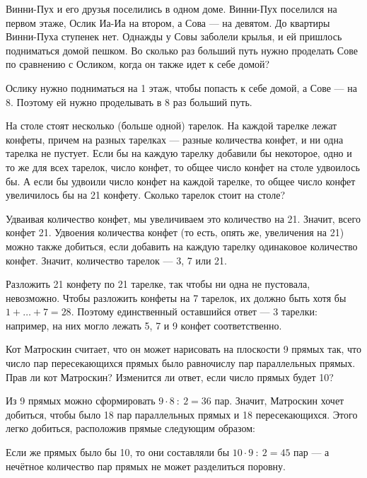

\begin{itemize}

	\itA Винни-Пух и его друзья поселились в одном доме. Винни-Пух поселился на первом этаже, Ослик Иа-Иа на втором, а Сова — на девятом. До квартиры Винни-Пуха ступенек нет. Однажды у Совы заболели крылья, и ей пришлось подниматься домой пешком. Во сколько раз больший путь нужно проделать Сове по сравнению с Осликом, когда он также идет к себе домой?
	
	\itr Ослику нужно подниматься на 1 этаж, чтобы попасть к себе домой, а Сове — на 8. Поэтому ей нужно проделывать в 8 раз больший путь.

	\itB На столе стоят несколько (больше одной) тарелок. На каждой тарелке лежат конфеты, причем на разных тарелках — разные количества конфет, и ни одна тарелка не пустует. Если бы на каждую тарелку добавили бы некоторое, одно и то же для всех тарелок, число конфет, то общее число конфет на столе удвоилось бы. А если бы удвоили число конфет на каждой тарелке, то общее число конфет увеличилось бы на 21 конфету. Сколько тарелок стоит на столе?
	
	\itr Удваивая количество конфет, мы увеличиваем это количество на 21. Значит, всего конфет 21. Удвоения количества конфет (то есть, опять же, увеличения на 21) можно также добиться, если добавить на каждую тарелку одинаковое количество конфет. Значит, количество тарелок — 3, 7 или 21.
	
	Разложить 21 конфету по 21 тарелке, так чтобы ни одна не пустовала, невозможно. Чтобы разложить конфеты на 7 тарелок, их должно быть хотя бы $1 + \ldots + 7 = 28$. Поэтому единственный оставшийся ответ — 3 тарелки: например, на них могло лежать 5, 7 и 9 конфет соответственно.

	\itC Кот Матроскин считает, что он может нарисовать на плоскости 9 прямых так, что число пар пересекающихся прямых было равно\linebreak числу пар параллельных прямых. Прав ли кот Матроскин? Изменится ли ответ, если число прямых будет 10?

	\itr Из 9 прямых можно сформировать $9 \cdot 8\ :\ 2 = 36$ пар. Значит, Матроскин хочет добиться, чтобы было 18 пар параллельных прямых и 18 пересекающихся. Этого легко добиться, расположив прямые следующим образом:
	
	\begin{center}  \end{center}
	
	Если же прямых было бы 10, то они составляли бы $10 \cdot 9\ :\ 2 = 45$ пар — а нечётное количество пар прямых не может разделиться поровну.

\end{itemize}


